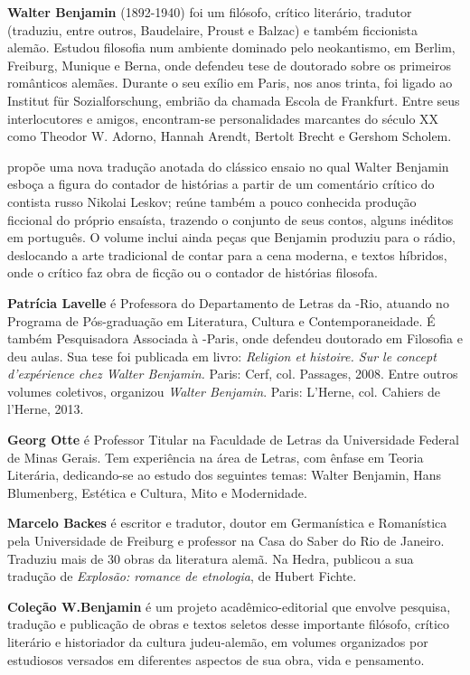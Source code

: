 
\textbf{Walter Benjamin} (1892-1940) foi um filósofo, crítico literário, tradutor (traduziu, entre outros, Baudelaire, Proust e Balzac) e também ficcionista alemão. Estudou filosofia num ambiente dominado pelo neokantismo, em Berlim, Freiburg, Munique e Berna, onde defendeu tese de doutorado sobre os primeiros românticos alemães. Durante o seu exílio em Paris, nos anos trinta, foi ligado ao Institut für Sozialforschung, embrião da chamada Escola de Frankfurt. Entre seus interlocutores e amigos, encontram-se personalidades marcantes do século XX como Theodor W. Adorno, Hannah Arendt, Bertolt Brecht e Gershom Scholem.

\textbf{\titulo} propõe uma nova tradução anotada do clássico ensaio no qual Walter Benjamin esboça a figura do contador de histórias a partir de um comentário crítico do contista russo Nikolai Leskov; reúne também a pouco conhecida produção ficcional do próprio ensaísta, trazendo o conjunto de seus contos, alguns inéditos em português. O volume inclui ainda peças que Benjamin produziu para o rádio, deslocando a arte tradicional de contar para a cena moderna, e textos híbridos, onde o crítico faz obra de ficção ou o contador de histórias filosofa.

\textbf{Patrícia Lavelle} é Professora do Departamento de Letras da -Rio, atuando no Programa de Pós-graduação em Literatura, Cultura e Contemporaneidade. É também Pesquisadora Associada à -Paris, onde defendeu doutorado em Filosofia e deu aulas. Sua tese foi publicada em livro: \emph{Religion et histoire. Sur le concept d’expérience chez Walter Benjamin.} Paris: Cerf, col. Passages, 2008. Entre outros volumes coletivos, organizou \emph{Walter Benjamin}. Paris: L’Herne, col. Cahiers de l’Herne, 2013. 

\textbf{Georg Otte} é Professor Titular na Faculdade de Letras da Universidade Federal de Minas Gerais. Tem experiência na área de Letras, com ênfase em Teoria Literária, dedicando-se ao estudo dos seguintes temas: Walter Benjamin, Hans Blumenberg, Estética e Cultura, Mito e Modernidade.

\textbf{Marcelo Backes} é escritor e tradutor, doutor em Germanística e Romanística pela Universidade de Freiburg e professor na Casa do Saber do Rio de Janeiro. Traduziu mais de 30 obras da literatura alemã. Na Hedra, publicou a sua tradução de \emph{Explosão: romance de etnologia}, de Hubert Fichte.

\textbf{Coleção W.Benjamin} é um projeto acadêmico-editorial que envolve pesquisa, tradução e publicação de obras e textos seletos desse importante filósofo, crítico literário e historiador da cultura judeu-alemão, em volumes organizados por estudiosos versados em diferentes aspectos de sua obra, vida e pensamento. 

